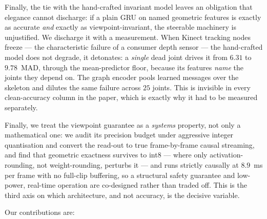 \documentclass[10pt,journal]{IEEEtran}
\begin{document}
Finally, the tie with the hand-crafted invariant model leaves an obligation that elegance cannot discharge: if a plain GRU on named geometric features is exactly as accurate \emph{and} exactly as viewpoint-invariant, the steerable machinery is unjustified. We discharge it with a measurement. When Kinect tracking nodes freeze --- the characteristic failure of a consumer depth sensor --- the hand-crafted model does not degrade, it detonates: a \emph{single} dead joint drives it from $6.31$ to $9.78$~MAD, through the mean-predictor floor, because its features \emph{name} the joints they depend on. The graph encoder pools learned messages over the skeleton and dilutes the same failure across $25$ joints. This is invisible in every clean-accuracy column in the paper, which is exactly why it had to be measured separately.

Finally, we treat the viewpoint guarantee as a \emph{systems} property, not only a mathematical one: we audit its precision budget under aggressive integer quantisation and convert the read-out to true frame-by-frame causal streaming, and find that geometric exactness survives to int8 --- where only activation-rounding, not weight-rounding, perturbs it --- and runs strictly causally at $8.9$~ms per frame with no full-clip buffering, so a structural safety guarantee and low-power, real-time operation are co-designed rather than traded off. This is the third axis on which architecture, and not accuracy, is the decisive variable.

Our contributions are:
\end{document}
